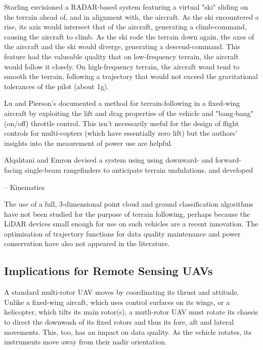 \documentclass[10pt,a4paper]{report}
\begin{document}
Starling \cite{Starling1971} envisioned a RADAR-based system featuring a virtual "ski" sliding on the terrain ahead of, and in alignment with, the aircraft. As the ski encountered a rise, its axis would intersect that of the aircraft, generating a climb-command, causing the aircraft to climb. As the ski rode the terrain down again, the axes of the aircraft and the ski would diverge, generating a descend-command. This feature had the valueable quality that on low-frequency terrain, the aircraft would follow it closely. On high-frequency terrain, the aircraft woud tend to smooth the terrain, following a trajectory that would not exceed the gravitational tolerances of the pilot (about 1g).

Lu and Pierson's \cite{Lu1995} documented a method for terrain-following in a fixed-wing aircraft by exploiting the lift and drag properties of the vehicle and "bang-bang" (on/off) throttle control. This isn't necessarily useful for the design of flight controls for multi-copters (which have essentially zero lift) but the authors' insights into the meaurement of power use are helpful. 

Alqahtani and Emron \cite{Alqahtani2018} devised a system using using downward- and forward-facing single-beam rangefinders to anticipate terrain undulations, and developed 

\cite{Alqahtani2018,Bolandi2013} -- Kinematics

The use of a full, 3-dimensional point cloud and ground classification algorithms have not been studied for the purpose of terrain following, perhaps because the LiDAR devices small enough for use on such vehicles are a recent innovation. The optimisation of trajectory functions for data quality maintenance and power conservation have also not appeared in the literature. 

\subsection{Implications for Remote Sensing UAVs}

A standard multi-rotor UAV moves by coordinating its thrust and attitude. Unlike a fixed-wing aircaft, which uses control surfaces on its wings, or a helicopter, which tilts its main rotor(s), a mutli-rotor UAV must rotate its chassis to direct the downwash of its fixed rotors and thus its fore, aft and lateral movements. This, too, has an impact on data quality. As the vehicle rotates, its instruments move away from their nadir orientation. 
\end{document}
